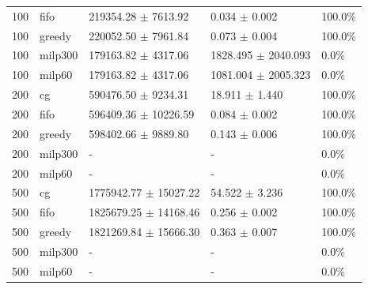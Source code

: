 \begin{tabular}{rllll}
100 & fifo & 219354.28 $\pm$ 7613.92 & 0.034 $\pm$ 0.002 & 100.0\% \\
100 & greedy & 220052.50 $\pm$ 7961.84 & 0.073 $\pm$ 0.004 & 100.0\% \\
100 & milp300 & 179163.82 $\pm$ 4317.06 & 1828.495 $\pm$ 2040.093 & 0.0\% \\
100 & milp60 & 179163.82 $\pm$ 4317.06 & 1081.004 $\pm$ 2005.323 & 0.0\% \\
200 & cg & 590476.50 $\pm$ 9234.31 & 18.911 $\pm$ 1.440 & 100.0\% \\
200 & fifo & 596409.36 $\pm$ 10226.59 & 0.084 $\pm$ 0.002 & 100.0\% \\
200 & greedy & 598402.66 $\pm$ 9889.80 & 0.143 $\pm$ 0.006 & 100.0\% \\
200 & milp300 & - & - & 0.0\% \\
200 & milp60 & - & - & 0.0\% \\
500 & cg & 1775942.77 $\pm$ 15027.22 & 54.522 $\pm$ 3.236 & 100.0\% \\
500 & fifo & 1825679.25 $\pm$ 14168.46 & 0.256 $\pm$ 0.002 & 100.0\% \\
500 & greedy & 1821269.84 $\pm$ 15666.30 & 0.363 $\pm$ 0.007 & 100.0\% \\
500 & milp300 & - & - & 0.0\% \\
500 & milp60 & - & - & 0.0\% \\
\bottomrule
\end{tabular}
